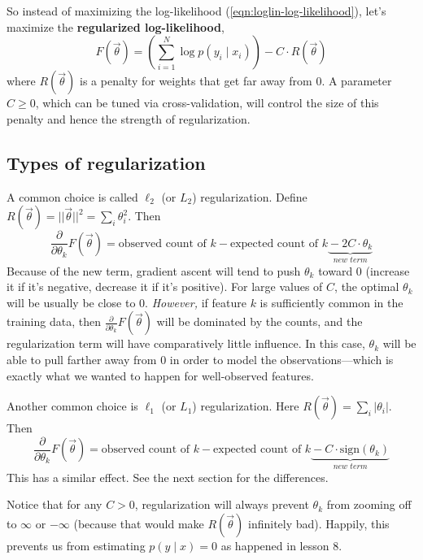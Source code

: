 \documentclass[11pt]{article}
\newcommand{\vtheta}{\vec{\theta}}
\newcommand{\diffk}{\frac{\partial}{\partial \theta_k}}
\begin{document}
So instead of maximizing the log-likelihood
(\ref{eqn:loglin-log-likelihood}), let's maximize the
{\bf regularized log-likelihood},
\begin{equation}\label{eqn:loglin-regularized}
  F(\vtheta) = \left( \sum_{i=1}^N \log p(y_i \mid x_i) \right) - C\cdot R(\vtheta)
\end{equation}
where $R(\vtheta)$ is a penalty for weights that get far away from 0.
A parameter $C \geq 0$, which can be tuned via cross-validation, will control the size of this penalty and
hence the strength of regularization.

\subsection{Types of regularization}

A common choice is called $\ell_2$ (or $L_2$) regularization.  Define
$R(\vtheta) = ||\vtheta||^2 = \sum_i \theta_i^2$.  Then
\begin{equation}
  \diffk F(\vtheta) = \textrm{observed count of $k$} -
  \textrm{expected count of $k$} \underbrace{\mbox{}-2C \cdot
    \theta_k}_{\textit{new term}}
\end{equation}
Because of the new term, gradient ascent will tend to push $\theta_k$
toward 0 (increase it if it's negative, decrease it if it's positive).
For large values of $C$, the optimal $\theta_k$ will be usually be
close to 0.  {\em However,} if feature $k$ is sufficiently common in the
training data, then $\diffk F(\vtheta)$ will be dominated by the
counts, and the regularization term will have comparatively little
influence.  In this case, $\theta_k$ will be able to pull farther away
from 0 in order to model the observations---which is exactly what we
wanted to happen for well-observed features.

Another common choice is $\ell_1$ (or $L_1$) regularization.  Here
$R(\vtheta) = \sum_i |\theta_i|$.  Then
\begin{equation}
  \diffk F(\vtheta) = \textrm{observed count of $k$} -
  \textrm{expected count of $k$} \underbrace{\mbox{}-C\cdot \textrm{sign}(\theta_k)}_{\textit{new term}}
\end{equation}
This has a similar effect.  See the next section for the differences.

Notice that for any $C > 0$, regularization will always prevent
$\theta_k$ from zooming off to $\infty$ or $-\infty$ (because that
would make $R(\vtheta)$ infinitely bad).  Happily, this prevents us from
estimating $p(y\mid x)=0$ as happened in lesson 8.
\end{document}
